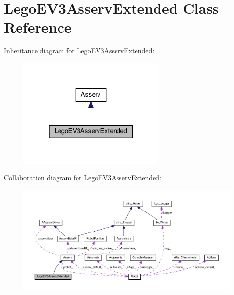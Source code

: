 \hypertarget{classLegoEV3AsservExtended}{}\section{Lego\+E\+V3\+Asserv\+Extended Class Reference}
\label{classLegoEV3AsservExtended}


Inheritance diagram for Lego\+E\+V3\+Asserv\+Extended\+:
\nopagebreak
\begin{figure}[H]
\begin{center}
\leavevmode
\includegraphics[width=208pt]{classLegoEV3AsservExtended__inherit__graph}
\end{center}
\end{figure}


Collaboration diagram for Lego\+E\+V3\+Asserv\+Extended\+:
\nopagebreak
\begin{figure}[H]
\begin{center}
\leavevmode
\includegraphics[width=350pt]{classLegoEV3AsservExtended__coll__graph}
\end{center}
\end{figure}
